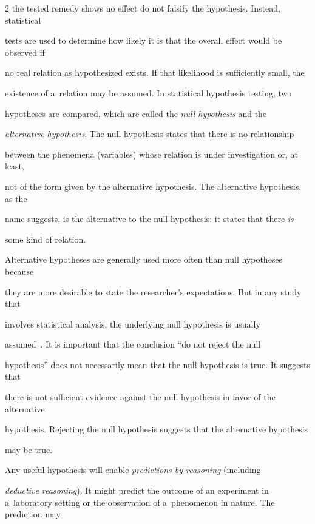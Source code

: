 \begin{multicols}{2}
the tested remedy shows no effect do not falsify the hypothesis. Instead, statistical


tests are used to determine how likely it is that the overall effect would be observed if


no real relation as hypothesized exists. If that likelihood is sufficiently small, the


existence of a~relation may be assumed. In statistical hypothesis testing, two


hypotheses are compared, which are called the \textit{null hypothesis} and the


\textit{alternative hypothesis}. The null hypothesis states that there is no relationship


between the phenomena (variables) whose relation is under investigation or, at least,


not of the form given by the alternative hypothesis. The alternative hypothesis, as the


name suggests, is the alternative to the null hypothesis: it states that there \textit{is}


some kind of relation.





  Alternative hypotheses are generally used more often than null hypotheses because


they are more desirable to state the researcher's expectations. But in any study that


involves statistical analysis, the underlying null hypothesis is usually


assumed~\cite{7-kl}. It is important that the conclusion ``do not reject the null


hypothesis'' does not necessarily mean that the null hypothesis is true. It suggests that


there is not sufficient evidence against the null hypothesis in favor of the alternative


hypothesis.  Rejecting the null hypothesis suggests that the alternative hypothesis


may be true.





  Any useful hypothesis will enable \textit{predictions by reasoning} (including


\textit{deductive reasoning}). It might predict the outcome of an experiment in a~laboratory setting or the observation of a~phenomenon in nature. The prediction may



\end{multicols}
